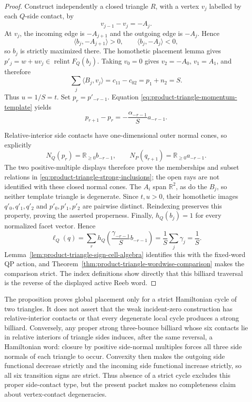 \begin{unverified}
\begin{proof}
Construct independently a closed triangle \(R\), with a vertex \(v_j\)
labelled by each \(Q\)-side contact, by
\begin{equation}
\label{eq:product-triangle-momentum-template}
 v_{j-1}-v_j=-A_j.
\end{equation}
At \(v_j\), the incoming edge is \(-A_{j+1}\) and the outgoing edge is
\(-A_j\).  Hence
\[
 \langle b_j,-A_{j+1}\rangle>0,
 \qquad \langle b_j,-A_j\rangle<0,
\]
so \(b_j\) is strictly maximized there.  The homothetic placement lemma gives
\(p'_j=w+u v_j\in\operatorname{relint}F_Q(b_j)\).  Taking \(v_0=0\)
gives \(v_2=-A_0\), \(v_1=A_1\), and therefore
\begin{equation}
\label{eq:product-triangle-momentum-denominator}
 \sum_j\langle B_j,v_j\rangle
 =c_{11}-c_{02}=p_1+n_2=S.
\end{equation}
Thus \(u=1/S=t\).  Set \(p_r=p'_{-r-1}\).  Equation
\eqref{eq:product-triangle-momentum-template} yields
\[
 p_{r+1}-p_r=-\frac{\alpha_{-r-1}}S a_{-r-1}.
\]

Relative-interior side contacts have one-dimensional outer normal cones, so
explicitly
\[
 N_Q(p_r)=\mathbb R_{\geq0}b_{-r-1},
 \qquad
 N_P(q_{r+1})=\mathbb R_{\geq0}a_{-r-1}.
\]
The two positive-multiple displays therefore prove the memberships and subset
relations in \eqref{eq:product-triangle-strong-inclusions}; the open rays are
not identified with these closed normal cones.  The \(A_i\) span
\(\mathbb R^2\), as do the \(B_j\), so neither template triangle is
degenerate.  Since \(t,u>0\), their homothetic images
\(q'_0,q'_1,q'_2\) and \(p'_0,p'_1,p'_2\) are pairwise distinct.
Reindexing preserves this property, proving the asserted properness.
Finally, \(h_Q(b_j)=1\) for every normalized facet vector.  Hence
\[
 \ell_Q(q)=\sum_r h_Q\left(\frac{\gamma_{-r-1}}S b_{-r-1}\right)
 =\frac1S\sum_j\gamma_j=\frac1S.
\]
Lemma~\ref{lem:product-triangle-sign-cell-algebra} identifies this with the
fixed-word QP action, and
Theorem~\ref{thm:product-triangle-wordwise-comparison} makes the comparison
strict.  The index definitions show directly that this billiard traversal is
the reverse of the displayed active Reeb word.
\end{proof}
\end{unverified}

The proposition proves global placement only for a strict Hamiltonian cycle
of two triangles.  It does not assert that the weak incident-zero construction
has relative-interior contacts or that every degenerate local cycle produces a
strong billiard.  Conversely, any proper strong three-bounce billiard whose
six contacts lie in relative interiors of triangle sides induces, after the
same reversal, a Hamiltonian word: closure by positive side-normal multiples
forces all three side normals of each triangle to occur.  Convexity then makes
the outgoing side functional decrease strictly and the incoming side
functional increase strictly, so all six transition signs are strict.  Thus
absence of a strict cycle excludes this proper side-contact type, but the
present packet makes no completeness claim about vertex-contact degeneracies.

